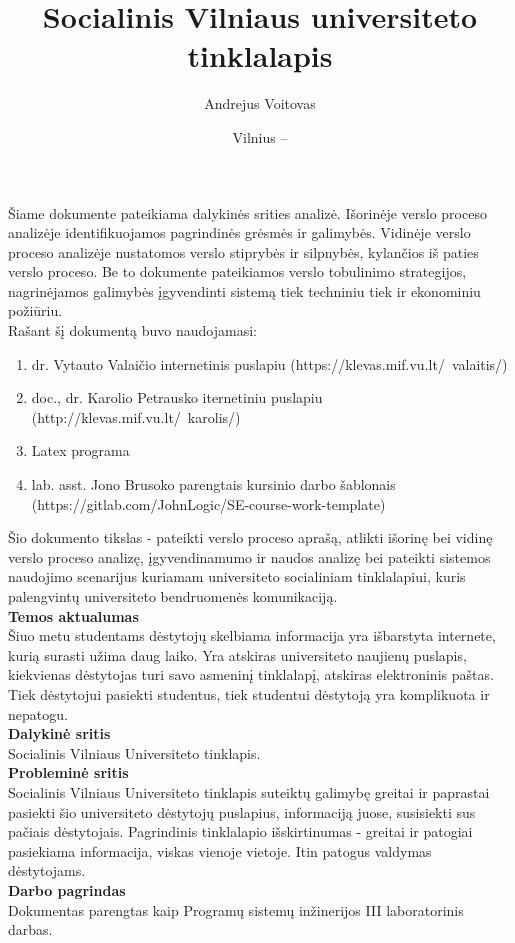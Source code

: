 \documentclass{VUMIFPSkursinis}
\title{Socialinis Vilniaus universiteto tinklalapis}
\author{Andrejus Voitovas}
\date{Vilnius – \the\year}
\begin{document}
\maketitle
\cleardoublepage{}
\setcounter{page}{2}
Šiame dokumente pateikiama dalykinės srities analizė. Išorinėje verslo proceso analizėje identifikuojamos pagrindinės grėsmės ir galimybės. Vidinėje verslo proceso analizėje nustatomos verslo stiprybės ir silpnybės, kylančios iš paties verslo proceso. Be to dokumente pateikiamos verslo tobulinimo strategijos, nagrinėjamos galimybės įgyvendinti sistemą tiek techniniu tiek ir ekonominiu požiūriu.\\
Rašant šį dokumentą buvo naudojamasi:
\begin{enumerate}
	\item dr. Vytauto Valaičio internetinis puslapiu (https://klevas.mif.vu.lt/~valaitis/) 
	\item doc., dr. Karolio Petrausko iternetiniu puslapiu (http://klevas.mif.vu.lt/~karolis/) 
	\item Latex programa
	\item lab. asst. Jono Brusoko parengtais kursinio darbo šablonais (https://gitlab.com/JohnLogic/SE-course-work-template)
	
\end{enumerate}
\newpage
\tableofcontents

Šio dokumento tikslas - pateikti verslo proceso aprašą, atlikti išorinę bei vidinę verslo proceso analizę, įgyvendinamumo ir naudos analizę bei pateikti sistemos naudojimo scenarijus kuriamam universiteto socialiniam tinklalapiui, kuris palengvintų universiteto bendruomenės komunikaciją.\\
\textbf{Temos aktualumas} \\
Šiuo metu studentams dėstytojų skelbiama informacija yra išbarstyta internete, kurią surasti užima daug laiko. Yra atskiras universiteto naujienų puslapis, kiekvienas dėstytojas turi savo asmeninį tinklalapį, atskiras elektroninis paštas. Tiek dėstytojui pasiekti studentus, tiek studentui dėstytoją yra komplikuota ir nepatogu.\\
\textbf{Dalykinė sritis}\\
Socialinis Vilniaus Universiteto tinklapis.\\
 \textbf{Probleminė sritis}\\
Socialinis Vilniaus Universiteto tinklapis suteiktų galimybę greitai ir paprastai pasiekti šio universiteto dėstytojų puslapius, informaciją juose, susisiekti sus pačiais dėstytojais. Pagrindinis tinklalapio išskirtinumas - greitai ir patogiai pasiekiama informacija, viskas vienoje vietoje. Itin patogus valdymas dėstytojams.\\
 \textbf{Darbo pagrindas} \\ 
Dokumentas parengtas kaip Programų sistemų inžinerijos III laboratorinis darbas.
\newpage
\end{document}
